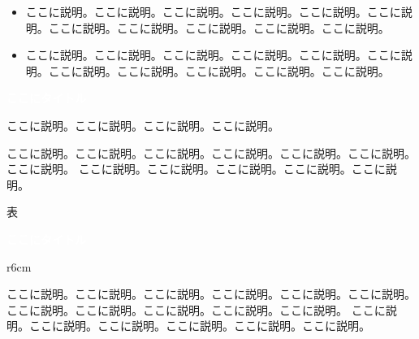 \documentclass[a4paper, 14pt, dvipdfmx, fleqn]{jsarticle}
\begin{document}
    \begin{itemize}
        \setlength{\itemsep}{3mm}
        \item {\Large ここに説明。ここに説明。ここに説明。ここに説明。ここに説明。ここに説明。ここに説明。ここに説明。ここに説明。ここに説明。ここに説明。}
        \item {\Large ここに説明。ここに説明。ここに説明。ここに説明。ここに説明。ここに説明。ここに説明。ここに説明。ここに説明。ここに説明。ここに説明。}
    \end{itemize}

    \newpage

    \begin{tcolorbox}[
        colback=myBlue,
        colframe=myBlue,
        sharpish corners]
        {\huge \bf \textcolor{white}{ここにタイトル}}
    \end{tcolorbox}

    \noindent
    {\Large ここに説明。ここに説明。ここに説明。ここに説明。}

    \noindent
    {\Large ここに説明。ここに説明。ここに説明。ここに説明。ここに説明。ここに説明。ここに説明。
    ここに説明。ここに説明。ここに説明。ここに説明。ここに説明。}

    \vspace{1cm}

    \begin{tcolorbox}
        \vspace{10cm}
        \hfill {\Large 表} \hfill
        \vspace{10cm}
    \end{tcolorbox}

    \newpage

    \begin{tcolorbox}[
        colback=myBlue,
        colframe=myBlue,
        sharpish corners]
        {\huge \bf \textcolor{white}{ここにタイトル}}
    \end{tcolorbox}

    \begin{wrapfigure}[6]{r}{6cm}
        \centering
    \end{wrapfigure}

    \noindent
    {\Large \hspace{1em}ここに説明。ここに説明。ここに説明。ここに説明。ここに説明。ここに説明。ここに説明。ここに説明。ここに説明。ここに説明。ここに説明。
    ここに説明。ここに説明。ここに説明。ここに説明。ここに説明。ここに説明。}
\end{document}
